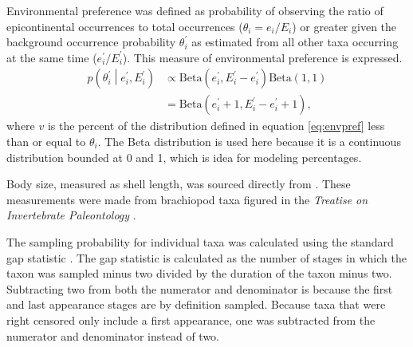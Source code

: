 \documentclass[11pt]{article}
\begin{document}
Environmental preference was defined as probability of observing the ratio of epicontinental occurrences to total occurrences (\(\theta_{i} = e_{i} / E_{i}\)) or greater given the background occurrence probability \(\theta^{\prime}_{i}\) as estimated from all other taxa occurring at the same time (\(e^{\prime}_{i} / E^{\prime}_{i}\)). This measure of environmental preference is expressed.
\begin{equation}
  \begin{aligned}
    p\left(\theta^{\prime}_{i} \middle| e^{\prime}_{i}, E^{\prime}_{i} \right) &\propto \mathrm{Beta}(e^{\prime}_{i}, E^{\prime}_{i} - e^{\prime}_{i}) \mathrm{Beta}(1, 1) \\
    &= \mathrm{Beta}(e^{\prime}_{i} + 1, E^{\prime}_{i} - e^{\prime}_{i} + 1),
  \end{aligned}
  \label{eq:envpref}
\end{equation}
where \(v\) is the percent of the distribution defined in equation \ref{eq:envpref} less than or equal to \(\theta_{i}\). The Beta distribution is used here because it is a continuous distribution bounded at 0 and 1, which is idea for modeling percentages.

Body size, measured as shell length, was sourced directly from \citet{Payne2014}. These measurements were made from brachiopod taxa figured in the \textit{Treatise on Invertebrate Paleontology} \citep{Brunton2007}.


The sampling probability for individual taxa was calculated using the standard gap statistic \citep{Foote1996e,Foote2000}. The gap statistic is calculated as the number of stages in which the taxon was sampled minus two divided by the duration of the taxon minus two. Subtracting two from both the numerator and denominator is because the first and last appearance stages are by definition sampled. Because taxa that were right censored only include a first appearance, one was subtracted from the numerator and denominator instead of two.
\end{document}
